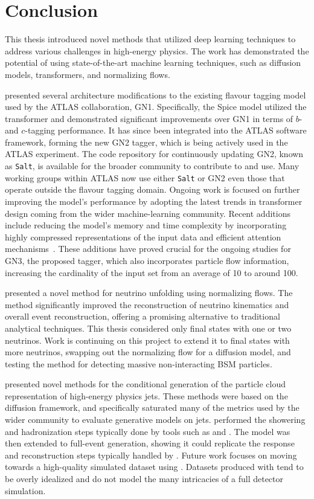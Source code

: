 \chapter{Conclusion}
\label{ch:conclusion}

This thesis introduced novel methods that utilized deep learning techniques to address various challenges in high-energy physics.
The work has demonstrated the potential of using state-of-the-art machine learning techniques, such as diffusion models, transformers, and normalizing flows.

 presented several architecture modifications to the existing flavour tagging model used by the ATLAS collaboration, GN1.
Specifically, the Spice model utilized the transformer and demonstrated significant improvements over GN1 in terms of $b$- and $c$-tagging performance.
It has since been integrated into the ATLAS software framework, forming the new GN2 tagger, which is being actively used in the ATLAS experiment.
The code repository for continuously updating GN2, known as \texttt{Salt}, is available for the broader community to contribute to and use.
Many working groups within ATLAS now use either \texttt{Salt} or GN2 even those that operate outside the flavour tagging domain.
Ongoing work is focused on further improving the model's performance by adopting the latest trends in transformer design coming from the wider machine-learning community.
Recent additions include reducing the model's memory and time complexity by incorporating highly compressed representations of the input data and efficient attention mechanisms~\cite{FlashAttentionFastMemoryEfficient}.
These additions have proved crucial for the ongoing studies for GN3, the proposed tagger, which also incorporates particle flow information, increasing the cardinality of the input set from an average of 10 to around 100.

 presented a novel method for neutrino unfolding using normalizing flows.
The \vvflows method significantly improved the reconstruction of neutrino kinematics and overall event reconstruction, offering a promising alternative to traditional analytical techniques.
This thesis considered only final states with one or two neutrinos.
Work is continuing on this project to extend it to final states with more neutrinos, swapping out the normalizing flow for a diffusion model, and testing the method for detecting massive non-interacting BSM particles.

 presented novel methods for the conditional generation of the particle cloud representation of high-energy physics jets.
These methods were based on the diffusion framework, and \pcdroid specifically saturated many of the metrics used by the wider community to evaluate generative models on jets.
\pcdroid performed the showering and hadronization steps typically done by tools such as \pythia and \herwig.
The model was then extended to full-event generation, showing it could replicate the response and reconstruction steps typically handled by \delphes.
Future work focuses on moving towards a high-quality simulated dataset using \geant.
Datasets produced with \delphes tend to be overly idealized and do not model the many intricacies of a full detector simulation.


